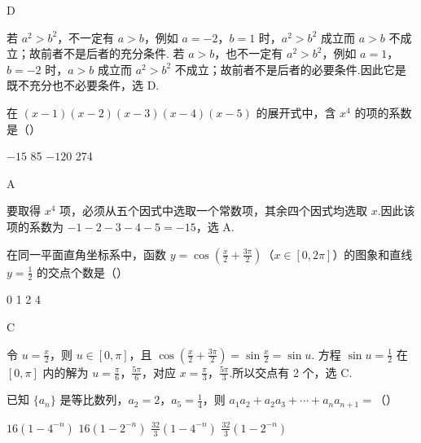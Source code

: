 \begin{answer}
D
\end{answer}

\begin{solution}
若 \(a^2>b^2\)，不一定有 \(a>b\)，例如 \(a=-2\)，\(b=1\) 时，\(a^2>b^2\) 成立而 \(a>b\) 不成立；故前者不是后者的充分条件.
若 \(a>b\)，也不一定有 \(a^2>b^2\)，例如 \(a=1\)，\(b=-2\) 时，\(a>b\) 成立而 \(a^2>b^2\) 不成立；故前者不是后者的必要条件.因此它是既不充分也不必要条件，选 D.
\end{solution}

\begin{problem}
在 \((x - 1)(x - 2)(x - 3)(x - 4)(x - 5)\) 的展开式中，含 \(x^4\) 的项的系数是（\quad）

\choices
    {\(-15\)}
    {85}
    {\(-120\)}
    {274}
\end{problem}

\begin{answer}
A
\end{answer}

\begin{solution}
要取得 \(x^4\) 项，必须从五个因式中选取一个常数项，其余四个因式均选取 \(x\).因此该项的系数为
\(-1-2-3-4-5=-15\)，选 A.
\end{solution}

\begin{problem}
在同一平面直角坐标系中，函数 \( y = \cos \left( \frac{x}{2} + \frac{3\pi}{2} \right) \)（\(x \in [0, 2\pi]\)）的图象和直线 \( y = \frac{1}{2} \) 的交点个数是（\quad）

\choices
    {0}
    {1}
    {2}
    {4}
\end{problem}

\begin{answer}
C
\end{answer}

\begin{solution}
令 \(u=\frac{x}{2}\)，则 \(u\in[0,\pi]\)，且
\(\cos\left(\frac{x}{2}+\frac{3\pi}{2}\right)=\sin\frac{x}{2}=\sin u\).
方程 \(\sin u=\frac12\) 在 \([0,\pi]\) 内的解为 \(u=\frac\pi6\)，\(\frac{5\pi}6\)，对应
\(x=\frac\pi3\)，\(\frac{5\pi}3\).所以交点有 2 个，选 C.
\end{solution}

\begin{problem}
已知 \(\{a_{n}\}\) 是等比数列，\(a_{2} = 2\)，\(a_{5} = \frac{1}{4}\)，则 \(a_{1}a_{2} + a_{2}a_{3} + \cdots + a_{n}a_{n+1} =\)（\quad）

\choices
    {\(16(1 - 4^{-n})\)}
    {\(16(1 - 2^{-n})\)}
    {\(\frac{32}{3}(1 - 4^{-n})\)}
    {\(\frac{32}{3}(1 - 2^{-n})\)}
\end{problem}

